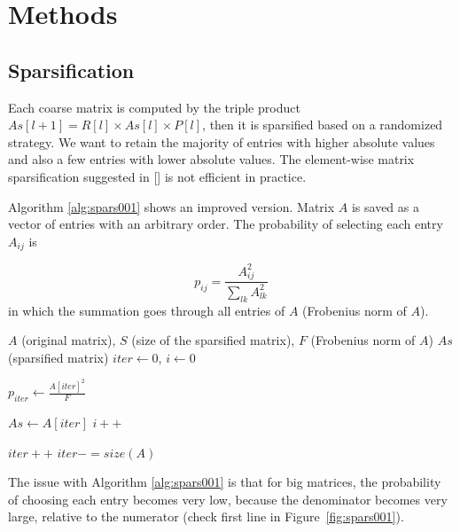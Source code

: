 \section{Methods}

\subsection{Sparsification}

Each coarse matrix is computed by the triple product $As[l+1] = R[l] \times As[l] \times P[l]$, then it is sparsified
based on a randomized strategy. We want to retain the majority of entries with higher absolute values and also
a few entries with lower absolute values. The element-wise matrix sparsification suggested in [] is not efficient in practice.



Algorithm \ref{alg:spars001} shows an improved version.
Matrix $A$ is saved as a vector of entries with an arbitrary order.
The probability of selecting each entry $A_{ij}$  is

\begin{equation}
 p_{ij} = \frac{A_{ij}^2}{\sum_{lk} A_{lk}^2}
\end{equation}
in which the summation goes through all entries of $A$ (Frobenius norm of $A$).

\begin{algorithm}[H] 
  \footnotesize
  \caption{$As = Sparsify(A, S, F)$} \label{alg:spars001} 
  \begin{algorithmic}[1]
    \Require $A$ (original matrix), $S$ (size of the sparsified matrix), $F$ (Frobenius norm of $A$)
    \Ensure  $As$ (sparsified matrix)
    \State $iter \leftarrow 0$, $i \leftarrow 0$
    
      \State $p_{iter} \leftarrow \frac{A[iter]^2}{F}$ 
      
	\State $As \leftarrow A[iter]$
	\State $i++$
      \EndIf
      
      \State $iter++$
	\State $iter -= size(A)$
      \EndIf
      
    \EndWhile
  \end{algorithmic}
\end{algorithm}

The issue with Algorithm \ref{alg:spars001} is that for big matrices, the probability of choosing each entry becomes very low,
because the denominator becomes very large, relative to the numerator (check first line in Figure~\ref{fig:spars001}).

